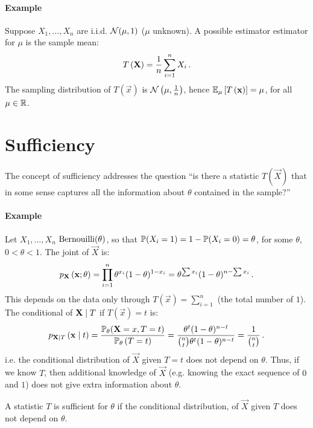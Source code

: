 
\paragraph{Example}

Suppose $X_1, \dotsc, X_n$ are i.i.d. $\mathcal{N}(\mu, 1)$ ($\mu$ unknown). A possible estimator estimator for $\mu$ is the sample mean:
\[
 T\left(\mathbf{X}\right) = \frac{1}{n}\sum_{i=1}^n X_i \, {.}
\]
The sampling distribution of $T\left(\vec{x}\right)$ is $\mathcal{N}\left(\mu, \frac{1}{n}\right)$, hence $\mathbb{E}_\mu \left[ T\left(\mathbf{x}\right) \right] = \mu$, for all $\mu \in \mathbb{R}$.

\section{Sufficiency}
The concept of sufficiency addresses the question ``is there a statistic $T\left(\vec{X}\right)$ that in some sense captures all the information about $\theta$ contained in the sample?''

\paragraph{Example\label{example:1.2}}

Let $X_1, \dotsc, X_n$ \iid $\text{Bernouilli}(\theta)$, so that $\mathbb{P}(X_i = 1) = 1 - \mathbb{P}(X_i = 0) = \theta$, for some $\theta$, $0 < \theta < 1$. The joint \pmf of $\vec{X}$ is:
\[
p_{\mathbf{X}}\left(\mathbf{x}; \theta\right) = \prod_{i = 1}^n \theta^{x_i}(1-\theta)^{1-x_i} = \theta^{\sum x_i}(1 - \theta)^{n - \sum x_i} \, {.}
\]
This depends on the data only through $T\left(\vec{x}\right) = \sum_{i=1}^n$ (the total number of $1$). The conditional \pmf of $\mathbf{X} \mid T$ if $T\left(\vec{x}\right) = t$ is:
\[
p_{\mathbf{X} \mid T} \left( \mathbf{x} \mid t\right) = \frac{\mathbb{P}_\theta(\mathbf{X} = x, T = t)}{\mathbb{P}_\theta\left(T = t\right)} = \frac{\theta^t(1-\theta)^{n-t}}{\binom{n}{t}\theta^t(1-\theta)^{n-t}} = \frac{1}{\binom{n}{t}} \, {.}
\]
i.e. the conditional distribution of $\vec{X}$ given $T = t$ does not depend on $\theta$. Thus, if we know $T$, then additional knowledge of $\vec{X}$ (e.g. knowing the exact sequence of $0$ and $1$) does not give extra information about $\theta$.

\begin{definition}
  A statistic $T$ is sufficient for $\theta$ if the conditional distribution, of $\vec{X}$ given $T$ does not depend on $\theta$.
\end{definition}

